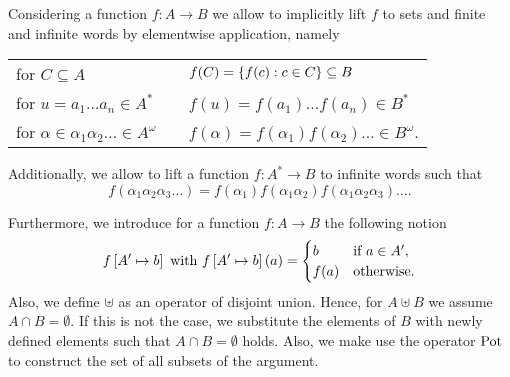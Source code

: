 Considering a function $f:A\rightarrow B$ we allow to implicitly lift $f$ to
sets and finite and infinite words by elementwise application, namely
\begin{center}
  \begin{tabular}{lp{0.5cm}l}
    for $C\subseteq A$ & & $f(C) = \left\{f(c) : c\in C\right\}\subseteq B$ \\
    for $u = a_{1}\dots a_{n}\in A^{*}$ & & $f(u) = f(a_{1})
    \dots f(a_{n}) \in B^{*}$ \\
  for $\alpha\in\alpha_{1}\alpha_{2}\dots\in A^{\omega}$
    & & $f(\alpha) = f(\alpha_{1})f(\alpha_{2})\dots\in B^{\omega}$.\\
  \end{tabular}
\end{center}
Additionally, we allow to lift a function $f:A^{*}\rightarrow B$ to infinite
words such that
\begin{equation*}
  f(\alpha_{1}\alpha_{2}\alpha_{3}\dots) = f(\alpha_{1})f(
    \alpha_{1}\alpha_{2})f(\alpha_{1}\alpha_{2}\alpha_{3})\dots.
\end{equation*}

Furthermore, we introduce for a function $f:A\rightarrow B$ the following
notion
\begin{equation*}
  f\left[A'\mapsto b\right]\text{ with }f\left[A'\mapsto b\right](a) = 
  \begin{cases}
    b&\text{if }a\in A',\\
    f(a)&\text{otherwise}.
  \end{cases}
\end{equation*}
Also, we define $\uplus$ as an operator of disjoint union. Hence, for
$A\uplus B$ we assume $A\cap B = \emptyset$. If this is not the case, we
substitute the elements of $B$ with newly defined elements such that
$A\cap B = \emptyset$ holds. Also, we make use the operator $\operatorname{Pot}$ to construct
the set of all subsets of the argument.
